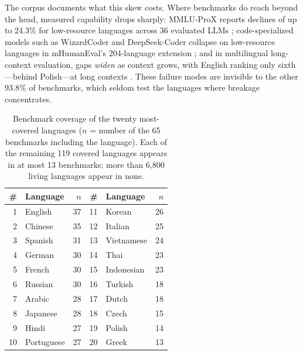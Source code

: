 \documentclass[letterpaper]{article} %
\begin{document}
The corpus documents what this skew costs. Where benchmarks do reach beyond the head, measured capability drops sharply: MMLU-ProX reports declines of up to 24.3\% for low-resource languages across 36 evaluated LLMs \cite{xuan2025mmlu}; code-specialized models such as WizardCoder and DeepSeek-Coder collapse on low-resource languages in mHumanEval's 204-language extension \cite{raihan-etal-2025-mhumaneval}; and in multilingual long-context evaluation, gaps \emph{widen} as context grows, with English ranking only sixth---behind Polish---at long contexts \cite{kim2025rulermeasureallbenchmarking}. These failure modes are invisible to the other 93.8\% of benchmarks, which seldom test the languages where breakage concentrates.
 
\begin{table}[t]
\centering
\small
\begin{tabular}{@{}rlr@{\hspace{1.4em}}rlr@{}}
\toprule
\# & Language & $n$ & \# & Language & $n$ \\
\midrule
1 & English & 37 & 11 & Korean & 26 \\
2 & Chinese & 35 & 12 & Italian & 25 \\
3 & Spanish & 31 & 13 & Vietnamese & 24 \\
4 & German & 30 & 14 & Thai & 23 \\
5 & French & 30 & 15 & Indonesian & 23 \\
6 & Russian & 30 & 16 & Turkish & 18 \\
7 & Arabic & 28 & 17 & Dutch & 18 \\
8 & Japanese & 28 & 18 & Czech & 15 \\
9 & Hindi & 27 & 19 & Polish & 14 \\
10 & Portuguese & 27 & 20 & Greek & 13 \\
\bottomrule
\end{tabular}
\caption{Benchmark coverage of the twenty most-covered languages ($n$ = number of the 65 benchmarks including the language). Each of the remaining 119 covered languages appears in at most 13 benchmarks; more than 6{,}800 living languages appear in none.}
\label{tab:languages}
\end{table}
 
\end{document}
